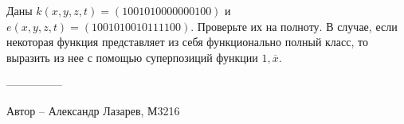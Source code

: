 \question
Даны $k(x, y, z, t) = (1001010000000100)$ и $e(x, y, z, t) = (1001010010111100)$. Проверьте их на полноту. В случае, если некоторая функция представляет из себя функционально полный класс, то выразить из нее с помощью суперпозиций функции $1, \overline{x}$.

---------------

Автор -- Александр Лазарев, М3216